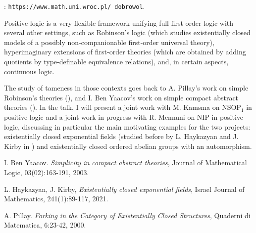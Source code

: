 \documentclass[bsl,meeting]{asl}
\def\urladdr#1{\endgraf\noindent{\it URL Address}: {\tt #1}.}
\newcommand{\NP}{}
\begin{document}
\thispagestyle{empty}


\NP%
%
%
%
%
\urladdr{https://www.math.uni.wroc.pl/\string~dobrowol}


Positive logic is a very flexible framework unifying full first-order logic with several other settings, such as Robinson's logic (which studies existentially closed models of a possibly non-companionable first-order universal theory), hyperimaginary extensions of first-order theories (which are obtained by adding quotients by type-definable equivalence relations), and, in certain aspects, continuous logic.

The study of tameness in those contexts goes back to A. Pillay's work on simple Robinson's theories (\cite{Pi}), and I. Ben Yaacov's work on simple compact abstract theories (\cite{BY}). In the talk, I will present a joint work with M. Kamsma on NSOP$_1$ in positive logic and a joint work in progress with R. Mennuni on NIP in positive logic, discussing in particular the main motivating examples for the two projects: existentially closed exponential fields (studied before by L. Haykazyan and J. Kirby in \cite{HK}) and existentially closed ordered abelian groups with an automorphism.



\begin{thebibliography}{99}

 I. Ben Yaacov.
{\em Simplicity in compact abstract theories}, Journal of Mathematical Logic, 03(02):163-191, 2003.

 L. Haykazyan, J. Kirby,
{\em Existentially closed exponential fields}, 
Israel
Journal of Mathematics, 241(1):89-117, 2021.


 A. Pillay.
{\em Forking in the Category of Existentially Closed Structures}, Quaderni di Matematica, 6:23-42, 2000.
\end{thebibliography}
\end{document}
